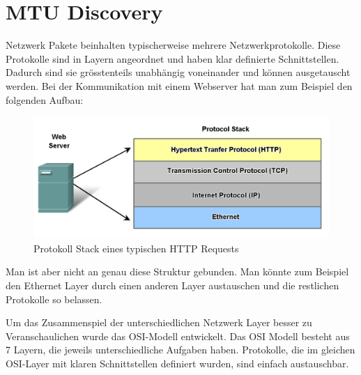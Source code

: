 \cleardoublepage
\section{MTU Discovery}

Netzwerk Pakete beinhalten typischerweise mehrere Netzwerkprotokolle. Diese Protokolle sind in Layern angeordnet und haben klar definierte Schnittstellen. Dadurch sind sie grösstenteils unabhängig voneinander und können ausgetauscht werden. Bei der Kommunikation mit einem Webserver hat man zum Beispiel den folgenden Aufbau\footnotemark[1]:

\begin{figure}[H]
    \begin{center}
        \includegraphics[trim=1 0 0 0,clip,width=\textwidth]{mainpart/analyse/img/HTTP_Stack}
    \end{center}
    \caption{Protokoll Stack eines typischen HTTP Requests}
\end{figure}


Man ist aber nicht an genau diese Struktur gebunden. Man könnte zum Beispiel den Ethernet Layer durch einen anderen Layer austauschen und die restlichen Protokolle so belassen.

Um das Zusammenspiel der unterschiedlichen Netzwerk Layer besser zu Veranschaulichen wurde das \ac{OSI}-Modell entwickelt. Das OSI Modell besteht aus 7 Layern, die jeweils unterschiedliche Aufgaben haben. Protokolle, die im gleichen \ac{OSI}-Layer mit klaren Schnittstellen definiert wurden, sind einfach austauschbar.

